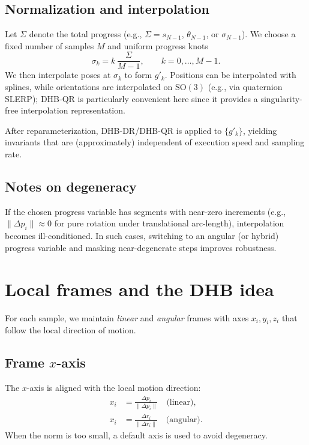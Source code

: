 \documentclass[11pt]{article}
\begin{document}
\subsection{Normalization and interpolation}
Let $\Sigma$ denote the total progress (e.g., $\Sigma = s_{N-1}$, $\theta_{N-1}$, or $\sigma_{N-1}$). We choose a fixed number of samples $M$ and uniform progress knots
\begin{equation}
  \sigma_k = k\,\frac{\Sigma}{M-1}, \qquad k=0,\dots,M-1.
\end{equation}
We then interpolate poses at $\sigma_k$ to form $g'_k$. Positions can be interpolated with splines, while orientations are interpolated on $\mathrm{SO}(3)$ (e.g., via quaternion SLERP); DHB-QR is particularly convenient here since it provides a singularity-free interpolation representation.

After reparameterization, DHB-DR/DHB-QR is applied to $\{g'_k\}$, yielding invariants that are (approximately) independent of execution speed and sampling rate.

\subsection{Notes on degeneracy}
If the chosen progress variable has segments with near-zero increments (e.g., $\lVert \Delta p_i\rVert\approx 0$ for pure rotation under translational arc-length), interpolation becomes ill-conditioned. In such cases, switching to an angular (or hybrid) progress variable and masking near-degenerate steps improves robustness.

\section{Local frames and the DHB idea}
For each sample, we maintain \emph{linear} and \emph{angular} frames with axes $x_i,y_i,z_i$ that follow the local direction of motion.

\subsection{Frame $x$-axis}
The $x$-axis is aligned with the local motion direction:
\begin{align}
  x_i &= \frac{\Delta p_i}{\lVert \Delta p_i\rVert} \quad \text{(linear)}, \\
  x_i &= \frac{\Delta r_i}{\lVert \Delta r_i\rVert} \quad \text{(angular)}.
\end{align}
When the norm is too small, a default axis is used to avoid degeneracy.
\end{document}
